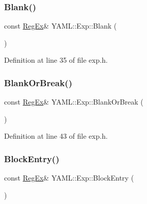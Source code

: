 \mbox{\label{namespace_y_a_m_l_1_1_exp_a9e46fa32369008b9058481ed04928ac9}} 
\subsubsection{\texorpdfstring{Blank()}{Blank()}}
{\footnotesize\ttfamily const \mbox{\hyperlink{class_y_a_m_l_1_1_reg_ex}{Reg\+Ex}}\& Y\+A\+M\+L\+::\+Exp\+::\+Blank (\begin{DoxyParamCaption}{ }\end{DoxyParamCaption})\hspace{0.3cm}{\ttfamily [inline]}}



Definition at line 35 of file exp.\+h.

\mbox{\label{namespace_y_a_m_l_1_1_exp_a5309dc4c7d913cc718b342101b111188}} 
\subsubsection{\texorpdfstring{BlankOrBreak()}{BlankOrBreak()}}
{\footnotesize\ttfamily const \mbox{\hyperlink{class_y_a_m_l_1_1_reg_ex}{Reg\+Ex}}\& Y\+A\+M\+L\+::\+Exp\+::\+Blank\+Or\+Break (\begin{DoxyParamCaption}{ }\end{DoxyParamCaption})\hspace{0.3cm}{\ttfamily [inline]}}



Definition at line 43 of file exp.\+h.

\mbox{\label{namespace_y_a_m_l_1_1_exp_a1f085ebf9844901e366a254366dc19b2}} 
\subsubsection{\texorpdfstring{BlockEntry()}{BlockEntry()}}
{\footnotesize\ttfamily const \mbox{\hyperlink{class_y_a_m_l_1_1_reg_ex}{Reg\+Ex}}\& Y\+A\+M\+L\+::\+Exp\+::\+Block\+Entry (\begin{DoxyParamCaption}{ }\end{DoxyParamCaption})\hspace{0.3cm}{\ttfamily [inline]}}



